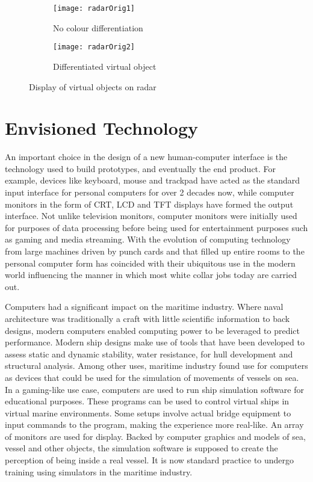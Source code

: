 \begin{figure}[ht]
    \centering
    \begin{subfigure}[b]{0.45\textwidth}
        \centering
        \texttt{[image: radarOrig1]}
        \caption{No colour differentiation}
        \label{fig:three sin x}
    \end{subfigure}
    \hfill
    \begin{subfigure}[b]{0.45\textwidth}
        \centering
        \texttt{[image: radarOrig2]}
        \caption{Differentiated virtual object}
        \label{fig:five over x}
    \end{subfigure}
    \caption{Display of virtual objects on radar}
    \label{fig:three graphs}
\end{figure}

\section{Envisioned Technology}

An important choice in the design of a new human-computer interface is the technology used to build prototypes, and eventually the end product. For example, devices like keyboard, mouse and trackpad have acted as the standard input interface for personal computers for over 2 decades now, while computer monitors in the form of CRT, LCD and TFT displays have formed the output interface. Not unlike television monitors, computer monitors were initially used for purposes of data processing before being used for entertainment purposes such as gaming and media streaming. With the evolution of computing technology from large machines driven by punch cards and that filled up entire rooms to the personal computer form has coincided with their ubiquitous use in the modern world influencing the manner in which most white collar jobs today are carried out. 

Computers had a significant impact on the maritime industry. Where naval architecture was traditionally a craft with little scientific information to back designs, modern computers enabled computing power to be leveraged to predict performance. Modern ship designs make use of tools that have been developed to assess static and dynamic stability, water resistance, for hull development and structural analysis. Among other uses, maritime industry found use for computers as devices that could be used for the simulation of movements of vessels on sea. In a gaming-like use case, computers are used to run ship simulation software for educational purposes. These programs can be used to control virtual ships in virtual marine environments. Some setups involve actual bridge equipment to input commands to the program, making the experience more real-like. An array of monitors are used for display. Backed by computer graphics and models of sea, vessel and other objects, the simulation software is supposed to create the perception of being inside a real vessel. It is now standard practice to undergo training using simulators in the maritime industry. 

